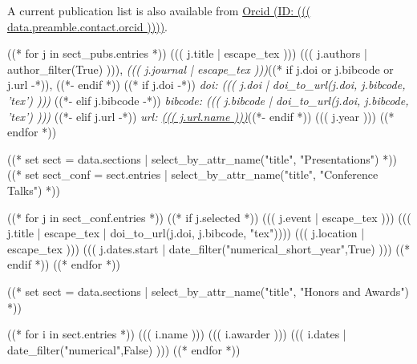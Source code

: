 \documentclass[10pt, letterpaper]{awesome-cv}
\begin{document}
A current publication list is also available from 
\href{https://orcid.org/((( data.preamble.contact.orcid )))}
     {Orcid (ID: ((( data.preamble.contact.orcid ))))}.
\begin{cvhonors}
  ((* for j in sect_pubs.entries *))
  \cvhonor
    {((( j.title | escape_tex )))}
    {((( j.authors | author_filter(True) ))),
     {\slshape\color{awesome} ((( j.journal | escape_tex )))}((* if j.doi or j.bibcode or j.url -*)), ((*-  endif *))
     ((* if j.doi -*))
     {\slshape\color{graytext} doi: ((( j.doi | doi_to_url(j.doi, j.bibcode, 'tex') )))}
     ((*- elif j.bibcode -*))
     {\slshape\color{graytext} bibcode: ((( j.bibcode | doi_to_url(j.doi, j.bibcode, 'tex') )))}
     ((*- elif j.url -*))
     {\slshape\color{graytext} url: \href{((( j.url.link )))}{((( j.url.name )))}}((*- endif *))}
    {}
    {((( j.year )))}
  ((* endfor *))
\end{cvhonors}

((* set sect = data.sections | select_by_attr_name("title", "Presentations") *))
((* set sect_conf = sect.entries | select_by_attr_name("title", "Conference Talks") *))


\begin{cvhonors}
((* for j in sect_conf.entries *))
((* if j.selected *))
\cvhonor
  {((( j.event | escape_tex )))}
  {((( j.title | escape_tex | doi_to_url(j.doi, j.bibcode, "tex"))))}
  {((( j.location | escape_tex )))}
  {((( j.dates.start | date_filter("numerical_short_year",True) )))}
((* endif *))
((* endfor *))
\end{cvhonors}

((* set sect = data.sections | select_by_attr_name("title", "Honors and Awards") *))
\begin{cvhonors}
((* for i in sect.entries *))
\cvhonor
  {((( i.name )))}
  {((( i.awarder )))}
  {}
  {((( i.dates | date_filter("numerical",False) )))}
((* endfor *))
\end{cvhonors}


\end{document}
